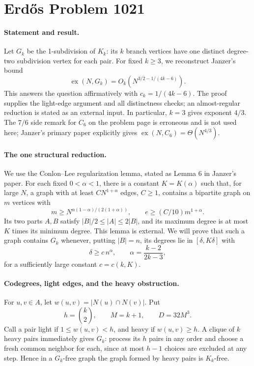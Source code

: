 \section*{Erd\H{o}s Problem 1021}

\paragraph{Statement and result.}
Let \(G_k\) be the 1-subdivision of \(K_k\): its \(k\) branch vertices have one distinct degree-two subdivision vertex for each pair. For fixed \(k\geq3\), we reconstruct Janzer's bound
\[
 \operatorname{ex}(N,G_k)=O_k\left(N^{3/2-1/(4k-6)}\right). \tag{1}
\]
This answers the question affirmatively with \(c_k=1/(4k-6)\). The proof supplies the light-edge argument and all distinctness checks; an almost-regular reduction is stated as an external input. In particular, \(k=3\) gives exponent \(4/3\). The \(7/6\) side remark for \(C_6\) on the problem page is erroneous and is not used here; Janzer's primary paper explicitly gives \(\operatorname{ex}(N,C_6)=\Theta(N^{4/3})\).

\paragraph{The one structural reduction.}
We use the Conlon--Lee regularization lemma, stated as Lemma 6 in Janzer's paper. For each fixed \(0<\alpha<1\), there is a constant \(K=K(\alpha)\) such that, for large \(N\), a graph with at least \(C N^{1+\alpha}\) edges, \(C\geq1\), contains a bipartite graph on \(m\) vertices with
\[
 m\geq N^{\alpha(1-\alpha)/(2(1+\alpha))},\qquad
 e\geq(C/10)m^{1+\alpha}.
\]
Its two parts \(A,B\) satisfy \(|B|/2\leq|A|\leq2|B|\), and its maximum degree is at most \(K\) times its minimum degree. This lemma is external. We will prove that such a graph contains \(G_k\) whenever, putting \(|B|=n\), its degrees lie in \([\delta,K\delta]\) with
\[
 \delta\geq c\,n^{\alpha},\qquad
 \alpha=\frac{k-2}{2k-3}, \tag{2}
\]
for a sufficiently large constant \(c=c(k,K)\).

\paragraph{Codegrees, light edges, and the heavy obstruction.}
For \(u,v\in A\), let \(w(u,v)=|N(u)\cap N(v)|\). Put
\[
 h=\binom k2,\qquad M=k+1,\qquad D=32M^3.
\]
Call a pair light if \(1\leq w(u,v)<h\), and heavy if \(w(u,v)\geq h\). A clique of \(k\) heavy pairs immediately gives \(G_k\): process its \(h\) pairs in any order and choose a fresh common neighbor for each, since at most \(h-1\) choices are excluded at any step. Hence in a \(G_k\)-free graph the graph formed by heavy pairs is \(K_k\)-free.

